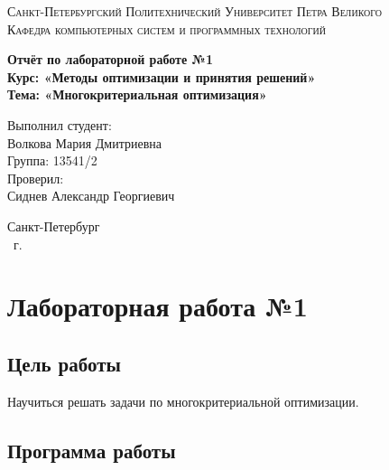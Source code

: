 \documentclass[14pt,a4paper,report]{report}
\begin{document}
\def\contentsname{Содержание}

\begin{titlepage}
 \begin{center}
  \textsc{Санкт-Петербургский Политехнический 
   Университет Петра Великого\\[5mm]
   Кафедра компьютерных систем и программных технологий}
  
  \vfill
  
  \textbf{Отчёт по лабораторной работе №1\\[3mm]
   Курс: «Методы оптимизации и принятия решений»\\[3mm]
   Тема: «Многокритериальная оптимизация»\\[35mm]
   }
 \end{center}
 
 \hfill
 \begin{minipage}{.5\textwidth}
  Выполнил студент:\\[2mm] 
  Волкова Мария Дмитриевна\\
  Группа: 13541/2\\[5mm]
  
  Проверил:\\[2mm] 
  Сиднев Александр Георгиевич
 \end{minipage}
 \vfill
 \begin{center}
  Санкт-Петербург\\ \the\year\ г.
 \end{center}
\end{titlepage}

\tableofcontents
\clearpage

\chapter{Лабораторная работа №1}

\section{Цель работы}

Научиться решать задачи по многокритериальной оптимизации.

\section{Программа работы}
\end{document}
